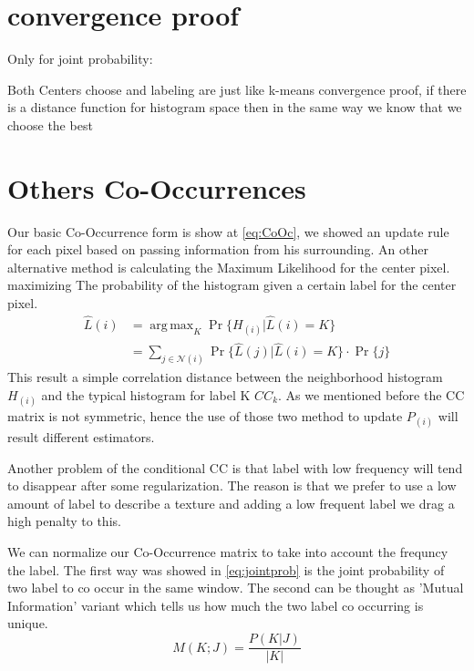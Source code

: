 \documentclass{article}
\DeclareMathOperator*{\argmax}{arg\,max}
\begin{document}
\section{convergence proof}
Only for joint probability:

Both Centers choose and labeling are just like k-means convergence proof, if there is a distance function for histogram space then in the same way we know that we choose the best 

\section{Others Co-Occurrences}

Our basic Co-Occurrence form is show at \eqref{eq:CoOc}, we showed an update rule for each pixel based on passing information from his surrounding.
An other alternative method is calculating the Maximum Likelihood for the center pixel. maximizing The probability of the histogram given a certain label for the center pixel.
\begin{align}
\hat{L}(i)&=\argmax_K \Pr \{H_{(i)}|\hat{L}(i)=K \}\\
&=\sum_{j\in\mathcal{N}(i)}^{} \Pr \{\hat{L}(j)|\hat{L}(i)=K \}\cdot \Pr \{j\}\nonumber
\end{align}
This result a simple correlation distance between the neighborhood histogram $ H_{(i)} $ and the typical histogram for label K $ CC_k $.
As we mentioned before the CC matrix is not symmetric, hence the use of those two method to update $ P_{(i)} $ will result different estimators.

Another problem of the conditional CC is that label with low frequency will tend to disappear after some regularization. The reason is that we prefer to use a low amount of label to describe a texture and adding a low frequent label we drag a high penalty to this.

We can normalize our Co-Occurrence matrix to take into account the frequncy the label.
The first way was showed in \eqref{eq:jointprob} is the joint probability of two label to co occur in the same window.
The second can be thought as 'Mutual Information' variant which tells us how much the two label co occurring is unique.
\begin{equation}
M(K;J)=\dfrac{P(K|J)}{|K|}
\end{equation} 
\end{document}
